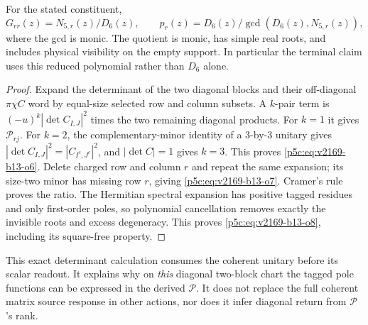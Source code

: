 \documentclass[11pt,a4paper]{article}
\begin{document}
\begin{theorem}
\label{p5c:v2169:b13:thm:nativepolynomial}
For the stated constituent,
\begin{equation}
 \boxed{G_{rr}(z)=N_{5,r}(z)/D_6(z),\qquad
 p_r(z)=D_6(z)/\gcd(D_6(z),N_{5,r}(z)),} \label{p5c:eq:v2169-b13-o8}
\end{equation}
where the gcd is monic. The quotient is monic, has simple real roots,
and includes physical visibility on the empty support. In particular the
terminal claim uses this reduced polynomial rather than $D_6$ alone.
\end{theorem}
\begin{proof}
Expand the determinant of the two diagonal blocks and their off-diagonal
$\pi\chi C$ word by equal-size selected row and column subsets. A $k$-pair
term is $(-u)^k|\det C_{I,J}|^2$ times the two remaining diagonal products.
For $k=1$ it gives $\mathcal P_{rj}$. For $k=2$, the complementary-minor
identity of a $3$-by-$3$ unitary gives
$|\det C_{I,J}|^2=|C_{I^c,J^c}|^2$, and $|\det C|=1$ gives $k=3$.
This proves \eqref{p5c:eq:v2169-b13-o6}. Delete charged row and column $r$ and repeat the same
expansion; its size-two minor has missing row $r$, giving \eqref{p5c:eq:v2169-b13-o7}.
Cramer's rule proves the ratio. The Hermitian spectral expansion has
positive tagged residues and only first-order poles, so polynomial
cancellation removes exactly the invisible roots and excess degeneracy.
This proves \eqref{p5c:eq:v2169-b13-o8}, including its square-free property.
\end{proof}

This exact determinant calculation consumes the coherent unitary before its
scalar readout. It explains why on \emph{this} diagonal two-block chart the
tagged pole functions can be expressed in the derived $\mathcal P$.
It does not replace the full coherent matrix source response in other
actions, nor does it infer diagonal return from $\mathcal P$'s rank.
\end{document}
